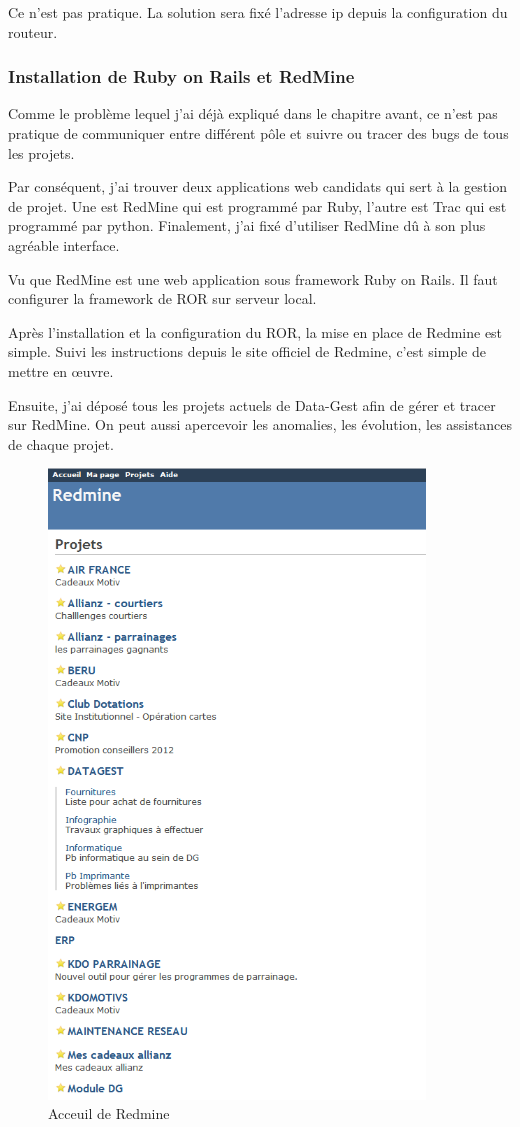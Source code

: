 Ce n'est pas pratique. La solution sera fixé l'adresse ip depuis la configuration du routeur.



\subsubsection{Installation de Ruby on Rails et RedMine}
Comme le problème lequel j'ai déjà expliqué dans le chapitre avant, ce n'est pas pratique de communiquer entre différent pôle  et suivre ou tracer des bugs de tous les projets. 

Par conséquent, j'ai trouver deux applications web candidats qui sert à la gestion de projet. Une est RedMine qui est programmé par Ruby, l'autre est Trac qui est programmé par python. Finalement, j'ai fixé d'utiliser RedMine dû à son plus agréable interface.  

Vu que RedMine est une web application sous framework Ruby on Rails. Il faut configurer la framework de ROR sur serveur local. 

Après l'installation et la configuration du ROR, la mise en place de Redmine est simple. Suivi les instructions depuis le site officiel de Redmine, c'est simple de mettre en œuvre. 

Ensuite, j'ai déposé tous les projets actuels de Data-Gest afin de gérer et tracer sur RedMine. On peut aussi apercevoir les anomalies, les évolution, les assistances de chaque projet.
\begin{figure}[hbtp]
\centering
\includegraphics[width=10cm]{body/images/redmine-accueil.PNG}
\caption{Acceuil de Redmine}
\end{figure}



